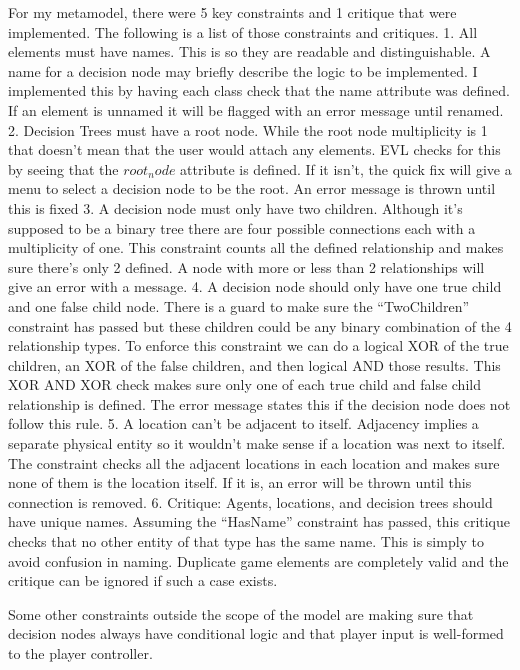 \documentclass[letterpaper,12pt]{article}  %
\begin{document}
For my metamodel, there were 5 key constraints and 1 critique that were implemented. The following is a list of those constraints and critiques.
1. All elements must have names. This is so they are readable and distinguishable. A name for a decision node may briefly describe the logic to be implemented. I implemented this by having each class check that the name attribute was defined. If an element is unnamed it will be flagged with an error message until renamed.
2.  Decision Trees must have a root node. While the root node multiplicity is 1 that doesn’t mean that the user would attach any elements. EVL checks for this by seeing that the $root_node$ attribute is defined. If it isn’t, the quick fix will give a menu to select a decision node to be the root. An error message is thrown until this is fixed
3. A decision node must only have two children. Although it’s supposed to be a binary tree there are four possible connections each with a multiplicity of one. This constraint counts all the defined relationship and makes sure there’s only 2 defined. A node with more or less than 2 relationships will give an error with a message.
4. A decision node should only have one true child and one false child node. There is a guard to make sure the “TwoChildren” constraint has passed but these children could be any binary combination of the 4 relationship types. To enforce this constraint we can do a logical XOR of the true children, an XOR of the false children, and then logical AND those results. This XOR AND XOR check makes sure only one of each true child and false child relationship is defined. The error message states this if the decision node does not follow this rule.
5. A location can’t be adjacent to itself. Adjacency implies a separate physical entity so it wouldn’t make sense if a location was next to itself. The constraint checks all the adjacent locations in each location and makes sure none of them is the location itself. If it is, an error will be thrown until this connection is removed.
6. Critique: Agents, locations, and decision trees should have unique names. Assuming the “HasName” constraint has passed, this critique checks that no other entity of that type has the same name. This is simply to avoid confusion in naming. Duplicate game elements are completely valid and the critique can be ignored if such a case exists.

Some other constraints outside the scope of the model are making sure that decision nodes always have conditional logic and that player input is well-formed to the player controller.
\end{document}
